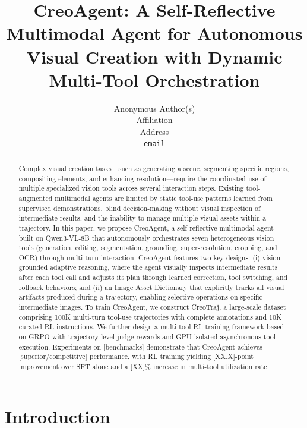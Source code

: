\documentclass{article}
\title{CreoAgent: A Self-Reflective Multimodal Agent for Autonomous Visual Creation with Dynamic Multi-Tool Orchestration}
\author{%
  Anonymous Author(s) \\
  Affiliation \\
  Address \\
  \texttt{email} \\
}
\begin{document}
\maketitle


\begin{abstract}

Complex visual creation tasks—such as generating a scene, segmenting specific regions, compositing elements, and enhancing resolution—require the coordinated use of multiple specialized vision tools across several interaction steps. Existing tool-augmented multimodal agents are limited by static tool-use patterns learned from supervised demonstrations, blind decision-making without visual inspection of intermediate results, and the inability to manage multiple visual assets within a trajectory. In this paper, we propose CreoAgent, a self-reflective multimodal agent built on Qwen3-VL-8B that autonomously orchestrates seven heterogeneous vision tools (generation, editing, segmentation, grounding, super-resolution, cropping, and OCR) through multi-turn interaction. CreoAgent features two key designs: (i) vision-grounded adaptive reasoning, where the agent visually inspects intermediate results after each tool call and adjusts its plan through learned correction, tool switching, and rollback behaviors; and (ii) an Image Asset Dictionary that explicitly tracks all visual artifacts produced during a trajectory, enabling selective operations on specific intermediate images. To train CreoAgent, we construct CreoTraj, a large-scale dataset comprising 100K multi-turn tool-use trajectories with complete annotations and 10K curated RL instructions. We further design a multi-tool RL training framework based on GRPO with trajectory-level judge rewards and GPU-isolated asynchronous tool execution. Experiments on [benchmarks] demonstrate that CreoAgent achieves [superior/competitive] performance, with RL training yielding [XX.X]-point improvement over SFT alone and a [XX]\% increase in multi-tool utilization rate.

\end{abstract}

\section{Introduction}
\end{document}
